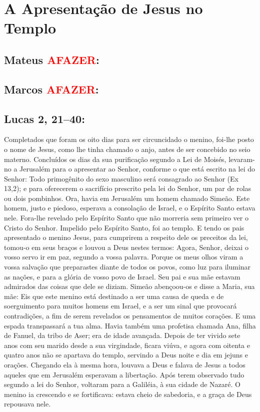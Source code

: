 \documentclass[10pt,a5paper]{book}
\newcommand{\from}[1]{\subsection*{#1}}
\newcommand{\TODO}{\textcolor{red}{\ttfamily AFAZER}}
\begin{document}

\section{A Apresentação de Jesus no Templo}

\from{Mateus \TODO:}

\from{Marcos \TODO:}

\from{Lucas 2, 21--40:}

Completados que foram os oito dias para ser circuncidado o menino, foi-lhe posto o nome de Jesus, como lhe tinha chamado o anjo, antes de ser concebido no seio materno.
Concluídos os dias da sua purificação segundo a Lei de Moisés, levaram-no a Jerusalém para o apresentar ao Senhor,
conforme o que está escrito na lei do Senhor:
Todo primogênito do sexo masculino será consagrado ao Senhor (Ex 13,2);
e para oferecerem o sacrifício prescrito pela lei do Senhor, um par de rolas ou dois pombinhos.
Ora, havia em Jerusalém um homem chamado Simeão.
Este homem, justo e piedoso, esperava a consolação de Israel, e o Espírito Santo estava nele.
Fora-lhe revelado pelo Espírito Santo que não morreria sem primeiro ver o Cristo do Senhor.
Impelido pelo Espírito Santo, foi ao templo.
E tendo os pais apresentado o menino Jesus, para cumprirem a respeito dele os preceitos da lei,
tomou-o em seus braços e louvou a Deus nestes termos:
Agora, Senhor, deixai o vosso servo ir em paz, segundo a vossa palavra.
Porque os meus olhos viram a vossa salvação
que preparastes diante de todos os povos,
como luz para iluminar as nações, e para a glória de vosso povo de Israel.
Seu pai e sua mãe estavam admirados das coisas que dele se diziam.
Simeão abençoou-os e disse a Maria, sua mãe:
Eis que este menino está destinado a ser uma causa de queda e de soerguimento para muitos homens em Israel, e a ser um sinal que provocará contradições,
a fim de serem revelados os pensamentos de muitos corações.
E uma espada transpassará a tua alma.
Havia também uma profetisa chamada Ana, filha de Fanuel, da tribo de Aser;
era de idade avançada.
Depois de ter vivido sete anos com seu marido desde a sua virgindade, ficara viúva, e agora com oitenta e quatro anos não se apartava do templo, servindo a Deus noite e dia em jejuns e orações.
Chegando ela à mesma hora, louvava a Deus e falava de Jesus a todos aqueles que em Jerusalém esperavam a libertação.
Após terem observado tudo segundo a lei do Senhor, voltaram para a Galiléia, à sua cidade de Nazaré.
O menino ia crescendo e se fortificava:
estava cheio de sabedoria, e a graça de Deus repousava nele.
\end{document}
